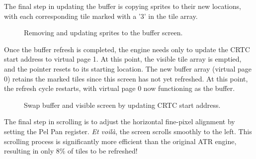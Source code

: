\documentclass[book.tex]{subfiles}
\begin{document}
  
\pagebreak
The final step in updating the buffer is copying sprites to their new locations, with each corresponding tile marked with a '3' in the tile array. 

\begin{figure}[H]
\centering
 \caption{Removing and updating sprites to the buffer screen.}
 \label{fig:kc4_6_step4}
\end{figure}

\pagebreak
Once the buffer refresh is completed, the engine needs only to update the CRTC start address to virtual page 1. At this point, the visible tile array is emptied, and the pointer resets to its starting location. The new buffer array (virtual page 0) retains the marked tiles since this screen has not yet refreshed. At this point, the refresh cycle restarts, with virtual page 0 now functioning as the buffer. 

\begin{figure}[H]
\centering
 \caption{Swap buffer and visible screen by updating CRTC start address.}
 \label{fig:kc4_6_step4}
\end{figure}

\pagebreak
The final step in scrolling is to adjust the horizontal fine-pixel alignment by setting the Pel Pan register. \textit{Et voil\`a}, the screen scrolls smoothly to the left. This scrolling process is significantly more efficient than the original ATR engine, resulting in only 8\% of tiles to be refreshed!\\
\end{document}
